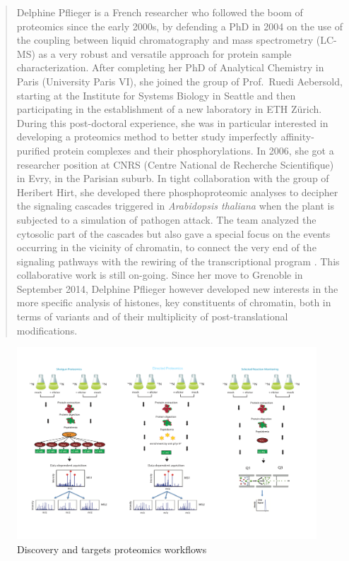 \documentclass[12pt,]{book}
\theoremstyle{definition}
\theoremstyle{definition}
\theoremstyle{remark}
\begin{document}
\begin{quote}
Delphine Pflieger is a French researcher who followed the boom of
proteomics since the early 2000s, by defending a PhD in 2004 on the use
of the coupling between liquid chromatography and mass spectrometry
(LC-MS) as a very robust and versatile approach for protein sample
characterization. After completing her PhD of Analytical Chemistry in
Paris (University Paris VI), she joined the group of Prof.~Ruedi
Aebersold, starting at the Institute for Systems Biology in Seattle and
then participating in the establishment of a new laboratory in ETH
Zürich. During this post-doctoral experience, she was in particular
interested in developing a proteomics method to better study imperfectly
affinity-purified protein complexes and their phosphorylations. In 2006,
she got a researcher position at CNRS (Centre National de Recherche
Scientifique) in Evry, in the Parisian suburb. In tight collaboration
with the group of Heribert Hirt, she developed there phosphoproteomic
analyses to decipher the signaling cascades triggered in
\emph{Arabidopsis thaliana} when the plant is subjected to a simulation
of pathogen attack. The team analyzed the cytosolic part of the cascades
but also gave a special focus on the events occurring in the vicinity of
chromatin, to connect the very end of the signaling pathways with the
rewiring of the transcriptional program
\citep{Bigeard:2014bl, Bigeard:2014df, Rayapuram:2014dc}. This
collaborative work is still on-going. Since her move to Grenoble in
September 2014, Delphine Pflieger however developed new interests in the
more specific analysis of histones, key constituents of chromatin, both
in terms of variants and of their multiplicity of post-translational
modifications.
\end{quote}

\newpage

\begin{figure}
\includegraphics[width=5.97in]{assets/prot1} \caption{Discovery and targets proteomics workflows}\label{fig:mainp}
\end{figure}
\end{document}
